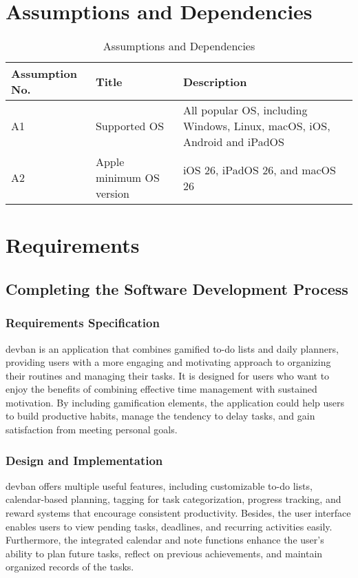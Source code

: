 \documentclass[11pt]{article}
\begin{document}
\section{Assumptions and Dependencies}
\begin{table}[h]
    \centering
    \caption{Assumptions and Dependencies}
    \begin{tabular}{p{2cm} p{3.5cm} p{10cm}}
        \toprule
        Assumption No. 
        & Title 
        & Description \\
        
        \midrule
        A1 
        & Supported OS
        & All popular OS, including Windows, Linux, macOS, iOS, Android and iPadOS \\

        \midrule
        A2
        & Apple minimum OS version 
        & iOS 26, iPadOS 26, and macOS 26  \\
 
        \bottomrule
    \end{tabular}
    \label{tab:docs_assumptions_and_dependencies}
\end{table}

\section{Requirements}
\subsection{Completing the Software Development Process}
\subsubsection{Requirements Specification}
devban is an application that combines gamified to-do lists and daily planners, providing users
with a more engaging and motivating approach to organizing their routines and managing their tasks.
It is designed for users who want to enjoy the benefits of combining effective time management
with sustained motivation. By including gamification elements, the application could help users to
build productive habits, manage the tendency to delay tasks, and gain satisfaction from meeting
personal goals.

\subsubsection{Design and Implementation}
devban offers multiple useful features, including customizable to-do lists, calendar-based planning, tagging for task categorization, progress tracking, and reward systems that encourage consistent productivity. Besides, the user interface enables users to view pending tasks, deadlines, and
recurring activities easily. Furthermore, the integrated calendar and note functions enhance the
user’s ability to plan future tasks, reflect on previous achievements, and maintain organized records
of the tasks.
\end{document}
